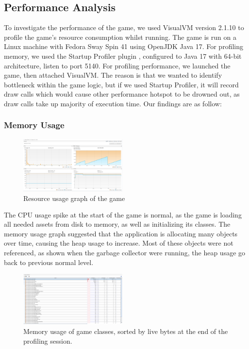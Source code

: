 \documentclass[conference]{IEEEtran}
\begin{document}
\subsection{Performance Analysis}

To investigate the performance of the game, we used VisualVM version 2.1.10 \cite{src:visual-vm} to profile the game's resource consumption whilst running.
The game is run on a Linux machine with Fedora Sway Spin 41 using OpenJDK Java 17.
For profiling memory, we used the Startup Profiler plugin \cite{src:startup-profiler}, configured to Java 17 with 64-bit architecture, listen to port 5140.
For profiling performance, we launched the game, then attached VisualVM.
The reason is that we wanted to identify bottleneck within the game logic, but if we used Startup Profiler, it will record draw calls which would cause other performance hotspot to be drowned out, as draw calls take up majority of execution time.
Our findings are as follow:

\subsubsection{Memory Usage}

\begin{figure}[htbp]
    \centerline{\includegraphics[width=0.48\textwidth]{assets/resource-usage.png}}
    \caption{Resource usage graph of the game}\label{fig:resource-usage}
\end{figure}

The CPU usage spike at the start of the game is normal, as the game is loading all needed assets from disk to memory, as well as initializing its classes.
The memory usage graph suggested that the application is allocating many objects over time, causing the heap usage to increase.
Most of these objects were not referenced, as shown when the garbage collector were running, the heap usage go back to previous normal level.

\begin{figure}[htbp]
    \centerline{\includegraphics[width=0.48\textwidth]{assets/memory-tree.png}}
    \caption{Memory usage of game classes, sorted by live bytes at the end of the profiling session.}\label{fig:memory-tree}
\end{figure}
\end{document}
